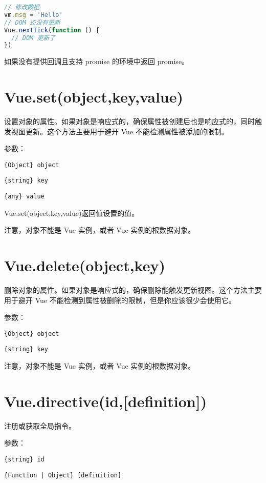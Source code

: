 \begin{lstlisting}[language=JavaScript]
// 修改数据
vm.msg = 'Hello'
// DOM 还没有更新
Vue.nextTick(function () {
  // DOM 更新了
})
\end{lstlisting}

如果没有提供回调且支持 promise 的环境中返回 promise。

\section{Vue.set(object,key,value)}

设置对象的属性。如果对象是响应式的，确保属性被创建后也是响应式的，同时触发视图更新。这个方法主要用于避开 Vue 不能检测属性被添加的限制。

参数：

\begin{compactitem}
\item \texttt{\{Object\} object}
\item \texttt{\{string\} key}
\item \texttt{\{any\} value}
\end{compactitem}

Vue.set(object,key,value)返回值设置的值。

注意，对象不能是 Vue 实例，或者 Vue 实例的根数据对象。

\section{Vue.delete(object,key)}


删除对象的属性。如果对象是响应式的，确保删除能触发更新视图。这个方法主要用于避开 Vue 不能检测到属性被删除的限制，但是你应该很少会使用它。

参数：

\begin{compactitem}
\item \texttt{\{Object\} object}
\item \texttt{\{string\} key}
\end{compactitem}

注意，对象不能是 Vue 实例，或者 Vue 实例的根数据对象。


\section{Vue.directive(id,[definition])}


注册或获取全局指令。

参数：

\begin{compactitem}
 \item \texttt{\{string\} id}
\item \texttt{\{Function | Object\} [definition]}
\end{compactitem}




